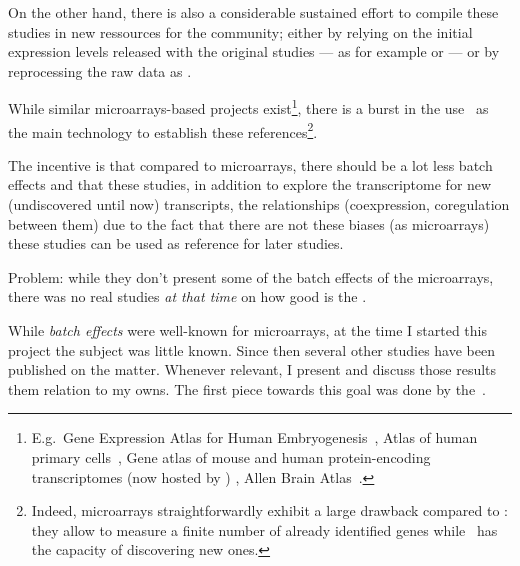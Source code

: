 On the other hand, there is also a considerable sustained effort
to compile these studies in new ressources for the community;
either by relying on the initial expression levels released with the original
studies --- as for example
 or
--- or
by reprocessing the raw data as
.

While similar microarrays-based projects exist\footnote{E.g.\ Gene Expression
Atlas for Human Embryogenesis~, Atlas of human primary
cells~, Gene atlas of mouse and human protein-encoding
transcriptomes (now hosted by ) ,
Allen Brain Atlas~.},
there is a burst in the use \Rnaseq\ as the main technology to establish
these references\footnote{Indeed, microarrays straightforwardly exhibit
a large drawback compared to \Rnaseq:
they allow to measure a finite number of already identified genes
while \Rnaseq\ has the capacity of discovering new ones.}.



The incentive is that compared to microarrays, there should be a lot less
batch effects and that these studies, in addition to explore the transcriptome
for new (undiscovered until now) transcripts, the relationships (coexpression,
coregulation between them) due to the fact that there are not these biases (as
microarrays) these studies can be used as reference for later studies.


Problem: while they don't present some of the batch effects of the microarrays,
there was no real studies \emph{at that time} on how good is the \Rnaseq.

While \emph{batch effects} were well-known for microarrays,
at the time I started this project
the subject was little known.
Since then several other studies have been published on the matter.
Whenever relevant, I present and discuss those results them relation to my owns.
The first piece towards this goal was done by the~.



\begin{comment}
Normal tissues sampled from various people are phenotypically very similar,
despite individual hereditary and environmental variations.
At molecular level,
technical noise, batch effects and physical limitations
are also generating variations.
\end{comment}

